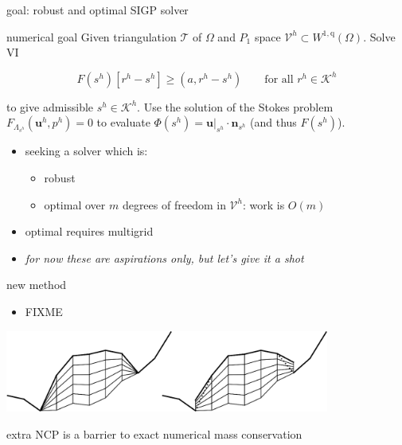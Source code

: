 \documentclass{beamer}
\newcommand{\bn}{\mathbf{n}}
\newcommand{\bu}{\mathbf{u}}
\newcommand{\ip}[2]{\left(#1,#2\right)}
\newcommand{\qq}{{\text{q}}}
\begin{document}
\begin{frame}{goal: robust and optimal SIGP solver}

\begin{block}{numerical goal}
Given triangulation $\mathcal{T}$ of $\Omega$ and $P_1$ space $\mathcal{V}^h \subset W^{1,\qq}(\Omega)$.  Solve VI

$$F(s^h)[r^h - s^h] \ge \ip{a}{r^h-s^h} \qquad \text{for all $r^h \in \mathcal{K}^h$}$$

to give admissible $s^h \in \mathcal{K}^h$.  Use the solution of the Stokes problem $F_{\Lambda_{s^h}}(\bu^h,p^h)=0$ to evaluate $\Phi(s^h)=\bu|_{s^h}\cdot\bn_{s^h}$ (and thus $F(s^h)$).
\end{block}

\begin{itemize}
\item seeking a solver which is:
    \begin{itemize}
    \item \alert{robust}
    \item \alert{optimal} over $m$ degrees of freedom in $\mathcal{V}^h$: work is $O(m)$
    \end{itemize}
\item optimal requires multigrid
\item<2> \emph{for now these are aspirations only, but let's give it a shot}
\end{itemize}
\end{frame}


\begin{frame}{new method}

\begin{itemize}
\item FIXME \cite{BuelerMitchell2022}
\end{itemize}

\includegraphics[width=0.8\textwidth]{figs/extruded.png}
\end{frame}


\begin{frame}{extra}
 NCP is a barrier to exact numerical mass conservation \cite{Bueler2021conservation}
\end{frame}

\end{document}
